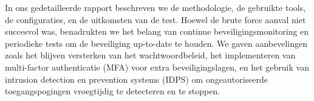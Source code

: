 In ons gedetailleerde rapport beschreven we de methodologie, de gebruikte tools, de configuraties, en de uitkomsten van de 
test. Hoewel de brute force aanval niet succesvol was, benadrukten we het belang van continue beveiligingsmonitoring en 
periodieke tests om de beveiliging up-to-date te houden. We gaven aanbevelingen zoals het blijven versterken van het 
wachtwoordbeleid, het implementeren van multi-factor authenticatie (MFA) voor extra beveiligingslagen, en het gebruik 
van intrusion detection en prevention systems (IDPS) om ongeautoriseerde toegangspogingen vroegtijdig te detecteren en 
te stoppen.